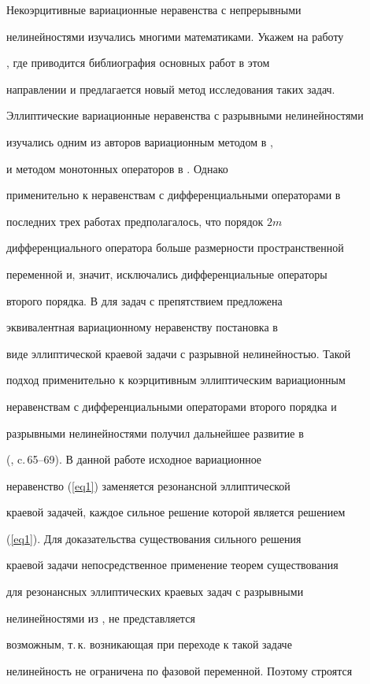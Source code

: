 Некоэрцитивные вариационные неравенства с непрерывными


нелинейностями изучались многими математиками. Укажем на работу


\cite{Adl}, где приводится библиография основных работ в этом


направлении и предлагается новый метод исследования таких задач.


Эллиптические вариационные неравенства с разрывными нелинейностями


изучались одним из авторов вариационным методом в \cite{Pav1},


\cite{Pav2} и методом монотонных операторов в \cite{Pav3}. Однако


применительно к неравенствам с дифференциальными операторами в


последних трех работах предполагалось, что порядок $2m$


дифференциального оператора больше размерности пространственной


переменной и, значит, исключались дифференциальные операторы


второго порядка. В \cite{Ch1} для задач с препятствием предложена


эквивалентная вариационному неравенству постановка в


виде эллиптической краевой задачи с разрывной нелинейностью. Такой


подход применительно к коэрцитивным эллиптическим вариационным


неравенствам с дифференциальными операторами второго порядка и


разрывными нелинейностями получил дальнейшее развитие в


(\cite{Pav4}, c.\,65--69). В данной работе исходное вариационное


неравенство (\ref{eq1}) заменяется резонансной эллиптической


краевой задачей, каждое сильное решение которой является решением


(\ref{eq1}). Для доказательства существования сильного решения


краевой задачи непосредственное применение теорем существования


для резонансных эллиптических краевых задач с разрывными


нелинейностями из \cite{Pav5}, \cite{Pav6} не представляется


возможным, т.\,к. возникающая при переходе к такой задаче


нелинейность не ограничена по фазовой переменной. Поэтому строятся


